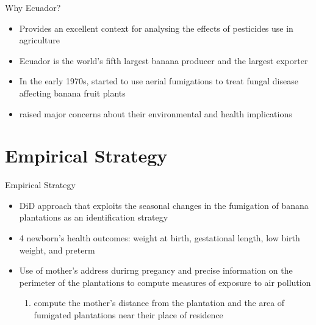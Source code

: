 \documentclass[hyperref={pdfpagelabels=false}]{beamer}
\begin{document}
        \begin{frame}{Why Ecuador?}
            \begin{itemize}
            \justifying
                \item Provides an excellent context for analysing the effects of pesticides use in agriculture
                \vspace{2mm}
                \item Ecuador is the world's fifth largest banana producer and the largest exporter
                \vspace{2mm}
                \item In the early 1970s, started to use aerial fumigations to treat fungal disease affecting banana fruit plants
                \vspace{2mm}
                \item \textcolor{bondiblue}{raised major concerns about their environmental and health implications}
            \end{itemize}
        \end{frame}

        \section{Empirical Strategy}
        \begin{frame}{Empirical Strategy}

        \begin{itemize}
        \justifying
            \item DiD approach that exploits the seasonal changes in the fumigation of banana plantations as an identification strategy
            \vspace{2mm}
            \item 4 newborn's health outcomes: weight at birth, gestational length, low birth weight, and preterm
            \vspace{2mm}
            \item Use of mother's address durirng pregancy and precise information on the perimeter of the plantations to compute measures of exposure to air pollution
            \begin{enumerate}
            \vspace{2mm}
                \item compute the mother's distance from the plantation and the area of fumigated plantations near their place of residence
            \end{enumerate}
        \end{itemize}
            
        \end{frame}
\end{document}
